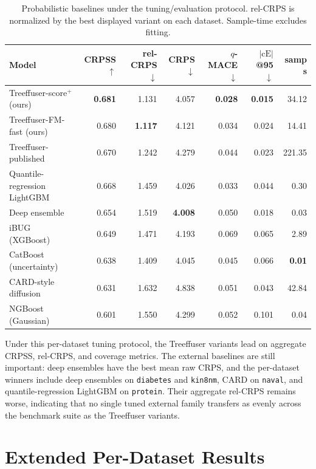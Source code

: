 \documentclass{uai2026}
\begin{document}
\begin{table}[!h]
  \centering
  \caption{Probabilistic baselines under the tuning/evaluation protocol. rel-CRPS is normalized by the best displayed variant on each dataset. Sample-time excludes fitting.}\label{tab:competitors}
  \scriptsize
  \begin{tabular}{lrrrrrr}
    \toprule
    Model & CRPSS $\uparrow$ & rel-CRPS $\downarrow$ & CRPS $\downarrow$ & $q$-MACE $\downarrow$ & $|\text{cE}|$@95 $\downarrow$ & samp s \\
    \midrule
    Treeffuser-score$^+$ (ours)     & \textbf{0.681} & 1.131 & 4.057 & \textbf{0.028} & \textbf{0.015} & 34.12 \\
    Treeffuser-FM-fast (ours)       & 0.680 & \textbf{1.117} & 4.121 & 0.034 & 0.024 & 14.41 \\
    Treeffuser-published            & 0.670 & 1.242 & 4.279 & 0.044 & 0.023 & 221.35 \\
    Quantile-regression LightGBM    & 0.668 & 1.459 & 4.026 & 0.033 & 0.044 & 0.30 \\
    Deep ensemble                   & 0.654 & 1.519 & \textbf{4.008} & 0.050 & 0.018 & 0.03 \\
    iBUG (XGBoost)                  & 0.649 & 1.471 & 4.193 & 0.069 & 0.065 & 2.89 \\
    CatBoost (uncertainty)          & 0.638 & 1.409 & 4.045 & 0.045 & 0.066 & \textbf{0.01} \\
    CARD-style diffusion            & 0.631 & 1.632 & 4.838 & 0.051 & 0.043 & 42.84 \\
    NGBoost (Gaussian)              & 0.601 & 1.550 & 4.299 & 0.052 & 0.101 & 0.04 \\
    \bottomrule
  \end{tabular}
\end{table}

Under this per-dataset tuning protocol, the Treeffuser variants lead on aggregate CRPSS, rel-CRPS, and coverage metrics. The external baselines are still important: deep ensembles have the best mean raw CRPS, and the per-dataset winners include deep ensembles on \texttt{diabetes} and \texttt{kin8nm}, CARD on \texttt{naval}, and quantile-regression LightGBM on \texttt{protein}. Their aggregate rel-CRPS remains worse, indicating that no single tuned external family transfers as evenly across the benchmark suite as the Treeffuser variants.

\section{Extended Per-Dataset Results}\label{app:perdata-ext}
\end{document}
